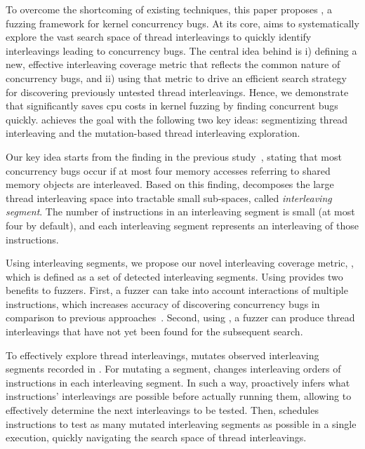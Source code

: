 To overcome the shortcoming of existing techniques, this paper proposes
\sys, a fuzzing framework for kernel concurrency bugs. 
At its core, \sys aims to systematically explore the vast search space of thread
interleavings to quickly identify
interleavings leading to concurrency bugs. The central idea behind \sys
is i) defining a new, effective interleaving coverage metric that reflects the 
common nature of concurrency bugs, and ii) using that metric to drive 
an efficient search strategy for discovering previously untested thread interleavings.
Hence, we demonstrate that \sys significantly saves cpu costs
in kernel fuzzing by finding concurrent bugs quickly.
\sys achieves the goal with the following two key ideas:
segmentizing thread interleaving and the mutation-based thread interleaving exploration.

%
Our key idea starts from the finding in the previous
study~\cite{learningfrommistakes}, stating that most concurrency bugs
occur if at most four memory accesses referring to shared memory
objects are interleaved.
%
Based on this finding, \sys decomposes the large thread interleaving
space into tractable small sub-spaces, called \textit{interleaving
  segment}. The number of instructions in an interleaving segment is
small (at most four by default), and each interleaving segment
represents an interleaving of those instructions.

Using interleaving segments, we propose our novel interleaving
coverage metric, \textit{\intcov}, which is defined as a set of
detected interleaving segments.
%
Using \intcov provides two benefits to fuzzers. First, a fuzzer can
take into account interactions of multiple instructions, which
increases accuracy of discovering concurrency bugs in comparison to
previous approaches~\cite{krace, conzzer}.  Second, using \intcov, a
fuzzer can produce thread interleavings that have not yet been found
for the subsequent search.

%
To effectively explore thread interleavings, \sys mutates observed
interleaving segments recorded in \intcov. For mutating a segment,
\sys changes interleaving orders of instructions in each
interleaving segment.
%
In such a way, \sys proactively infers what instructions'
interleavings are possible before actually running them, allowing \sys
to effectively determine the next interleavings to be tested.
%
Then, \sys schedules instructions to test as many mutated interleaving
segments as possible in a single execution, quickly navigating the search space of thread interleavings.

